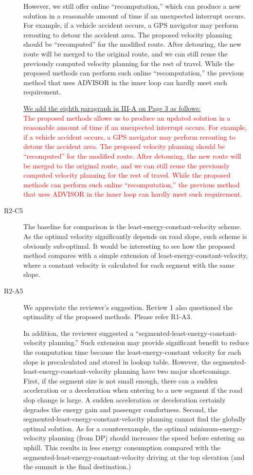 \documentclass[onecolumn]{IEEEconf}
\begin{document}
\begin{description}
However, we still offer online ``recomputation,'' which can produce a new solution in a reasonable amount of time if an unexpected interrupt occurs. For example, if a vehicle accident occurs, a GPS navigator may perform rerouting to detour the accident area. The proposed velocity planning should be ``recomputed'' for the modified route. After detouring, the new route will be merged to the original route, and we can still reuse the previously computed  velocity planning for the rest of travel. While the proposed methods can perform such online ``recomputation,'' the previous method that uses ADVISOR in the inner loop can hardly meet such requirement. 

\uline{We add the eighth paragraph in III-A on Page 3 as follows:}\\
\textcolor{red}{The proposed methods allows us to produce an updated solution in a reasonable amount of time if an unexpected interrupt occurs. For example, if a vehicle accident occurs, a GPS navigator may perform rerouting to detour the accident area. The proposed velocity planning should be ``recomputed'' for the modified route. After detouring, the new route will be merged to the original route, and we can still reuse the previously computed  velocity planning for the rest of travel. While the proposed methods can perform such online ``recomputation,'' the previous method that uses ADVISOR in the inner loop can hardly meet such requirement.}

\item [R2-C5] The baseline for comparison is the least-energy-constant-velocity scheme. As the optimal velocity significantly depends on road slope, such scheme is obviously sub-optimal. It would be interesting to see how the proposed method compares with a simple extension of least-energy-constant-velocity, where a constant velocity is calculated for each segment with the same slope.

\item [R2-A5] We appreciate the reviewer's suggestion. Review 1 also questioned the optimality of the proposed methods. Please  refer R1-A3. 

In addition, the reviewer suggested a ``segmented-least-energy-constant-velocity planning.'' Such extension may provide significant benefit to reduce the computation time because the least-energy-constant velocity for each slope is precalculated and stored in lookup table. 
However, the segmented-least-energy-constant-velocity planning have two major shortcomings. First, if the segment size is not small enough, there can a sudden acceleration or a deceleration when entering to a new segment if the road slop change is large. A sudden acceleration or deceleration certainly degrades the energy gain and passenger comfortness. Second, the segmented-least-energy-constant-velocity planning cannot find the globally optimal solution. As for a counterexample, the optimal minimum-energy-velocity planning (from DP) should increases  the speed before entering an uphill. This results in less energy consumption compared with the segmented-least-energy-constant-velocity driving at the top elevation (and the summit is the final destination.)  


\end{description}
\end{document}
